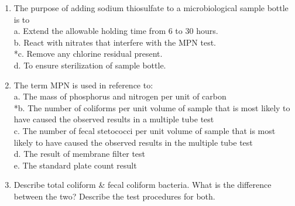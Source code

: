 \begin{enumerate}
\item  The purpose of adding sodium thiosulfate to a microbiological sample bottle is to \\

a. Extend the allowable holding time from 6 to 30 hours. \\
b. React with nitrates that interfere with the MPN test. \\
*c. Remove any chlorine residual present. \\
d. To ensure sterilization of sample bottle. 

\item  The term MPN is used in reference to: \\

a. The mass of phosphorus and nitrogen per unit of carbon \\
*b. The number of coliforms per unit volume of sample that is most likely to have caused the observed results in a multiple tube test \\
c. The number of fecal stetococci per unit volume of sample that is most likely to have caused the observed results in the multiple tube test \\
d. The result of membrane filter test \\
e. The standard plate count result 

\item Describe total coliform \& fecal coliform bacteria.  What is the difference between the two?  Describe the test procedures for both.



\end{enumerate}
